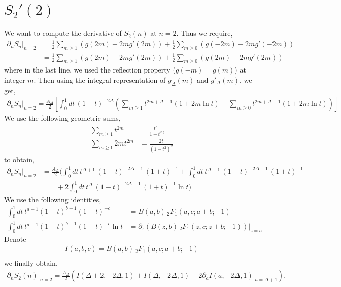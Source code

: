 \documentclass[11pt]{article}
\newcommand{\p}{\partial}
\newcommand{\nn}{\nonumber}
\newcommand{\lb}{\left(}
\newcommand{\rb}{\right)}
\begin{document}
\section{\texorpdfstring{$S_2'(2)$}{ S2'(2)}}
We want to compute the derivative of $S_2(n)$ at $n=2$. Thus we require,
\begin{align}
    \p_n S_n |_{n=2} &= \frac{1}{2}\sum_{m\geq 1} \lb g(2m) + 2m g'(2m) \rb + \frac{1}{2}\sum_{m\geq 0} \lb g(-2m) -2m g'(-2m) \rb \\
    &= \frac{1}{2}\sum_{m\geq 1} \lb g(2m) + 2m g'(2m) \rb + \frac{1}{2}\sum_{m\geq 0} \lb g(2m) +2m g'(2m) \rb
\end{align}
where in the last line, we used the reflection property ($g(-m) = g(m)$) at integer $m$. Then using the integral representation of $g_{\Delta}(m)$ and $g'_\Delta (m)$, we get,
\begin{align}
    \p_n S_n |_{n=2} = \frac{A_\Delta}{2}\left[ \int_0^1 dt \, (1-t)^{-2\Delta} \lb \sum_{m\geq 1}t^{2m+\Delta - 1}(1+2m \ln t) + \sum_{m\geq 0} t^{2m+\Delta - 1}(1+2m \ln t)\rb\right]
\end{align}
We use the following geometric sums,
\begin{align}
    \sum_{m\geq 1} t^{2m} &= \frac{t^2}{1-t^2},\\
    \sum_{m\geq 1} 2mt^{2m}&= \frac{2t}{(1-t^2)^2}
\end{align}
to obtain,
\begin{align}
    \p_n S_n |_{n=2} &= \frac{A_\Delta}{2}\Big( \int_0^1 dt \, t^{\Delta +1}\, (1-t)^{-2\Delta - 1}\, (1+t)^{-1} + \int_0^1 dt \, t^{\Delta -1}\, (1-t)^{-2\Delta - 1}\, (1+t)^{-1} \nn \\
    & \qquad +2\int_0^1 dt \, t^{\Delta }\, (1-t)^{-2\Delta - 1}\, (1+t)^{-1}\ln t \Big)
\end{align}
We use the following identities,
\begin{align}
    \int_0^1 dt \, t^{a-1} (1-t)^{b-1} (1+t)^{-c} &= B(a,b)\, _2F_1(a,c;a+b;-1)\\
    \int_0^1 dt \, t^{a-1} (1-t)^{b-1} (1+t)^{-c} \ln t &= \p_z \lb B(z,b)\, _2F_1(z,c;z+b;-1) \rb|_{z=a}
\end{align}
Denote 
\begin{align}
    I(a,b,c) = B(a,b) \, _2F_1(a,c;a+b;-1) \\
\end{align}
we finally obtain,
\begin{align}
    \p_nS_2(n)|_{n=2} = \frac{A_\Delta}{2}\lb I(\Delta + 2,-2\Delta,1) + I(\Delta,-2\Delta,1) +2\p_aI(a,-2\Delta,1)|_{a = \Delta +1}\rb.
\end{align}
\end{document}
